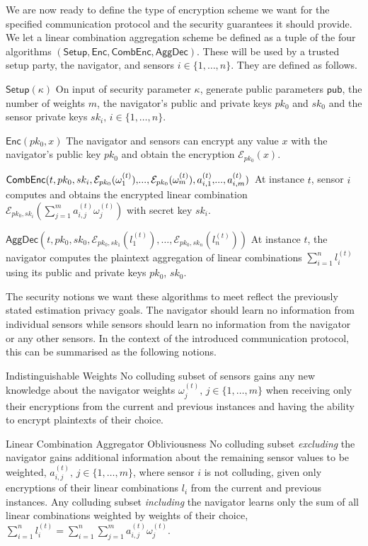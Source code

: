 \documentclass[10pt,letterpaper,oneside,twocolumn,journal]{IEEEtran}
\theoremstyle{definition}
\theoremstyle{definition}
\theoremstyle{remark}
\begin{document}
We are now ready to define the type of encryption scheme we want for the specified communication protocol and the security guarantees it should provide. We let a linear combination aggregation scheme be defined as a tuple of the four algorithms $(\mathsf{Setup}, \mathsf{Enc}, \mathsf{CombEnc}, \mathsf{AggDec})$. These will be used by a trusted setup party, the navigator, and sensors $i\in\{1,\dots,n\}$. They are defined as follows.
\begin{LaTeXdescription}
    \item[$\mathsf{Setup}(\kappa)$] On input of security parameter $\kappa$, generate public parameters $\mathsf{pub}$, the number of weights $m$, the navigator's public and private keys $pk_0$ and $sk_0$ and the sensor private keys $sk_i,\,i\in\{1,\dots,n\}$.
    \item[$\mathsf{Enc}(pk_0, x)$] The navigator and sensors can encrypt any value $x$ with the navigator's public key $pk_0$ and obtain the encryption $\mathcal{E}_{pk_0}(x)$.
    \item[$\mathsf{CombEnc}(t, pk_0, sk_i, \mathcal{E}_{pk_0}(\omega_1^{(t)}),\!...,\mathcal{E}_{pk_0}(\omega_m^{(t)}),a^{(t)}_{i,1},\!...,a^{(t)}_{i,m})\hspace*{1.2pt}$] At instance $t$, sensor $i$ computes and obtains the encrypted linear combination $\mathcal{E}_{pk_0,sk_i}(\sum^m_{j=1}a^{(t)}_{i,j}\omega^{(t)}_j)$ with secret key $sk_i$.
    \item[$\mathsf{AggDec}(t, pk_0, sk_0, \mathcal{E}_{pk_0,sk_1}(l^{(t)}_1),\dots,\mathcal{E}_{pk_0,sk_n}(l^{(t)}_n))$] At instance $t$, the navigator computes the plaintext aggregation of linear combinations $\sum^{n}_{i=1}l_i^{(t)}$ using its public and private keys $pk_0$, $sk_0$.
\end{LaTeXdescription}
The security notions we want these algorithms to meet reflect the previously stated estimation privacy goals. The navigator should learn no information from individual sensors while sensors should learn no information from the navigator or any other sensors. In the context of the introduced communication protocol, this can be summarised as the following notions.
\begin{LaTeXdescription}
    \item[Indistinguishable Weights] No colluding subset of sensors gains any new knowledge about the navigator weights $\omega^{(t)}_j,\,j\in\{1,\dots,m\}$ when receiving only their encryptions from the current and previous instances and having the ability to encrypt plaintexts of their choice.
    \item[Linear Combination Aggregator Obliviousness] No colluding subset \textit{excluding} the navigator gains additional information about the remaining sensor values to be weighted, $a^{(t)}_{i,j},\,j\in\{1,\dots,m\}$, where sensor $i$ is not colluding, given only encryptions of their linear combinations $l_i$ from the current and previous instances. Any colluding subset \textit{including} the navigator learns only the sum of all linear combinations weighted by weights of their choice, $\sum^{n}_{i=1}l_i^{(t)}=\sum^{n}_{i=1}\sum^{m}_{j=1} a^{(t)}_{i,j}\omega^{(t)}_j$.
\end{LaTeXdescription}
\end{document}

